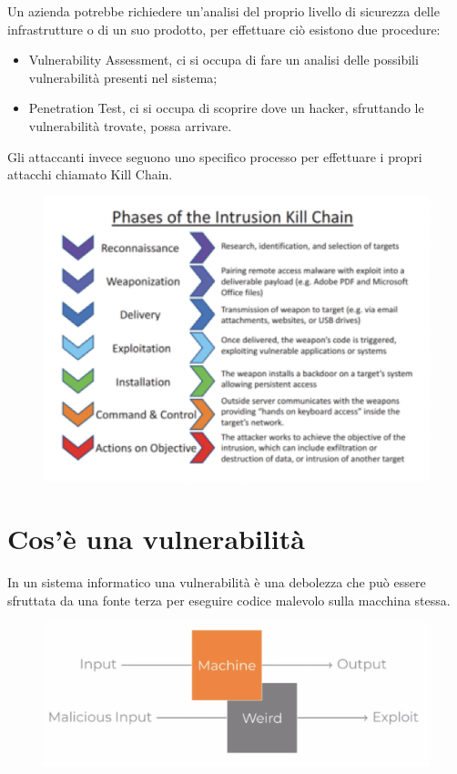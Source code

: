 Un azienda potrebbe richiedere un'analisi del proprio livello di sicurezza delle infrastrutture o di un suo prodotto, per effettuare ciò esistono due procedure:
\begin{itemize}
    \item Vulnerability Assessment, ci si occupa di fare un analisi delle possibili vulnerabilità presenti nel sistema;
    \item Penetration Test, ci si occupa di scoprire dove un hacker, sfruttando le vulnerabilità trovate, possa arrivare.
\end{itemize}

Gli attaccanti invece seguono uno specifico processo per effettuare i propri attacchi chiamato Kill Chain.
\begin{figure}[h!]
    \centering
    \includegraphics[width=\linewidth]{res/kill_chain.png}
    \caption{}
\end{figure}

\section{Cos'è una vulnerabilità}
In un sistema informatico una vulnerabilità è una debolezza che può essere sfruttata da una fonte terza per eseguire codice malevolo sulla macchina stessa.
\begin{figure}[h!]
    \centering
    \includegraphics[width=\textwidth]{res/weird_machine.png}
    \caption{}
\end{figure}
